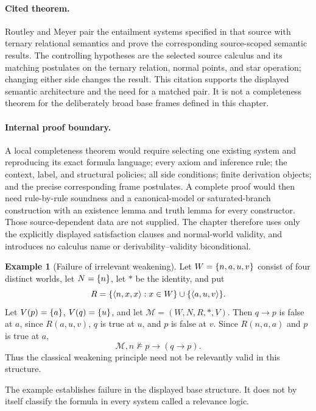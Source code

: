 \documentclass[11pt,oneside,openany]{book}
\theoremstyle{definition}
\newtheorem{example}[definition]{Example}
\theoremstyle{plain}
\theoremstyle{remark}
\DeclarePairedDelimiter{\set}{\lbrace}{\rbrace}
\DeclarePairedDelimiter{\angles}{\langle}{\rangle}
\newcommand{\notentails}{\not\models}
\newcommand{\tuple}[1]{\angles{#1}}
\begin{document}
\paragraph{Cited theorem.}
Routley and Meyer \cite[pp.~53--73]{RoutleyMeyer1972} pair the entailment
systems specified in that source with ternary relational semantics and prove
the corresponding source-scoped semantic results.  The controlling hypotheses
are the selected source calculus and its matching postulates on the ternary
relation, normal points, and star operation; changing either side changes the
result.  This citation supports the displayed semantic architecture and the
need for a matched pair.  It is not a completeness theorem for the deliberately
broad base frames defined in this chapter.

\paragraph{Internal proof boundary.}
A local completeness theorem would require selecting one existing system and
reproducing its exact formula language; every axiom and inference rule; the
context, label, and structural policies; all side conditions; finite derivation
objects; and the precise corresponding frame postulates.  A complete proof
would then need rule-by-rule soundness and a canonical-model or
saturated-branch construction with an existence lemma and truth lemma for
every constructor.  Those source-dependent data are not supplied.  The chapter
therefore uses only the explicitly displayed satisfaction clauses and
normal-world validity, and introduces no calculus name or
derivability--validity biconditional.

\begin{example}[Failure of irrelevant weakening]
Let \(W=\set{n,a,u,v}\) consist of four distinct worlds, let \(N=\set n\),
let \({*}\) be the identity, and put
\[
  R=\set{\tuple{n,x,x}:x\in W}\cup\set{\tuple{a,u,v}}.
\]
Let \(V(p)=\set a\), \(V(q)=\set u\), and let
\(\mathcal M=(W,N,R,{*},V)\).  Then \(q\to p\) is false at \(a\), since
\(R(a,u,v)\), \(q\) is true at \(u\), and \(p\) is false at \(v\).  Since
\(R(n,a,a)\) and \(p\) is true at \(a\),
\[
  \mathcal M,n\notentails p\to(q\to p).
\]
Thus the classical weakening principle need not be relevantly valid in this
structure.
\end{example}

The example establishes failure in the displayed base structure.  It does not
by itself classify the formula in every system called a relevance logic.
\end{document}

